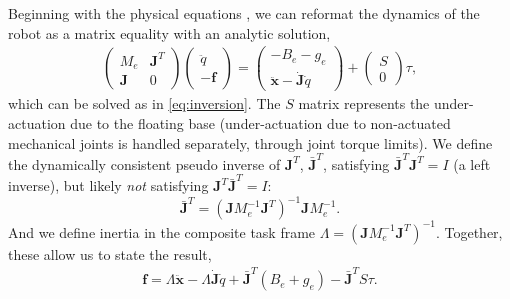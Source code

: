 Beginning with the physical equations , we can reformat the dynamics of the robot as a matrix equality with an analytic solution, 
\begin{gather}
\begin{pmatrix}
M_e & \mathbf{J}^T\\ \mathbf{J} & 0
\end{pmatrix}
\begin{pmatrix}
\ddot q \\ -\mathbf f
\end{pmatrix}
=
\begin{pmatrix}
- B_e - g_e \\ \ddot {\mathbf x} -\dot{ \mathbf{J}}\dot q
\end{pmatrix}
+
\begin{pmatrix}
S \\ 0
\end{pmatrix}
\tau, 
\end{gather}
which can be solved as in \eqref{eq:inversion}. The $S$ matrix represents the under-actuation due to the floating base (under-actuation due to non-actuated mechanical joints is handled separately, through joint torque limits). We define the dynamically consistent pseudo inverse of $\mathbf{J}^T$, ${\bar{\mathbf{J}}^T}$, satisfying ${\bar{\mathbf{J}}^T}\mathbf{J}^T  = I$ (a left inverse), but likely \emph{not} satisfying $\mathbf{J}^T{\bar{\mathbf{J}}^T}=I$:
\begin{equation}
{\bar{\mathbf{J}}^T} = (\mathbf{J} M_e^{-1} \mathbf{J}^T)^{-1}\mathbf{J} M_e^{-1}.
\end{equation}
And we define inertia in the composite task frame $\Lambda=(\mathbf{J} M_e^{-1} \mathbf{J}^T)^{-1}$.
Together, these allow us to state the result,
\begin{gather}
{\mathbf f}
=
\Lambda\ddot{\mathbf x} -\Lambda\dot{ \mathbf{J}}\dot q + {\bar{\mathbf{J}}^T}(B_e + g_e) 
-{\bar{\mathbf{J}}^T}S 
\tau.\label{eq:dynamic_equilibrium}
\end{gather}

